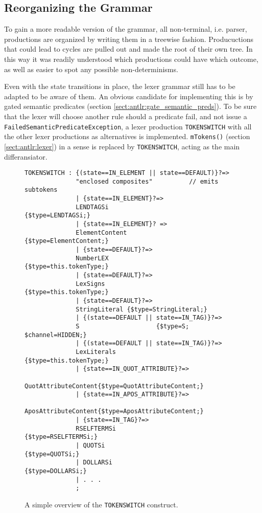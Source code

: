 \subsection{Reorganizing the Grammar}
\label{sect:rewriteGrammar:reorganizing}

To gain a more readable version of the grammar, all non-terminal, i.e. parser, productions are organized by writing them in a treewise fashion. Producuctions that could lead to cycles are pulled out and made the root of their own tree. In this way it was readily understood which productions could have which outcome, as well as easier to spot any possible non-determinisms.

Even with the state transitions in place, the lexer grammar still has to be adapted to be aware of them. An obvious candidate for implementing this is by gated semantic predicates (section \ref{sect:antlr:gate_semantic_preds}). To be sure that the lexer will choose another rule should a predicate fail, and not issue a \verb!FailedSemanticPredicateException!, a lexer production \verb!TOKENSWITCH! with all the other lexer productions as alternatives is implemented. \verb!mTokens()! (section \ref{sect:antlr:lexer}) in a sense is replaced by \verb!TOKENSWITCH!, acting as the main differansiator. 

\begin{figure}[h!]
\begin{Verbatim}
TOKENSWITCH : {(state==IN_ELEMENT || state==DEFAULT)}?=>
              "enclosed composites"          // emits subtokens
              | {state==IN_ELEMENT}?=>
              LENDTAGSi                      {$type=LENDTAGSi;}
              | {state==IN_ELEMENT}? =>
              ElementContent            {$type=ElementContent;} 
              | {state==DEFAULT}?=>
              NumberLEX	                {$type=this.tokenType;}
              | {state==DEFAULT}?=>
              LexSigns                  {$type=this.tokenType;}
              | {state==DEFAULT}?=>
              StringLiteral {$type=StringLiteral;}
              | {(state==DEFAULT || state==IN_TAG)}?=>
              S                     {$type=S; $channel=HIDDEN;}
              | {(state==DEFAULT || state==IN_TAG)}?=>
              LexLiterals               {$type=this.tokenType;} 
              | {state==IN_QUOT_ATTRIBUTE}?=>
              QuotAttributeContent{$type=QuotAttributeContent;}
              | {state==IN_APOS_ATTRIBUTE}?=>
              AposAttributeContent{$type=AposAttributeContent;}
              | {state==IN_TAG}?=>
              RSELFTERMSi                  {$type=RSELFTERMSi;}
              | QUOTSi                          {$type=QUOTSi;}
              | DOLLARSi                      {$type=DOLLARSi;}
              | . . .
              ;

\end{Verbatim}
\caption[Overview of the \texttt{TOKENSWITCH} construct]{A simple overview of the \texttt{TOKENSWITCH} construct.}
\label{fig:tokenswitch}
\end{figure}

